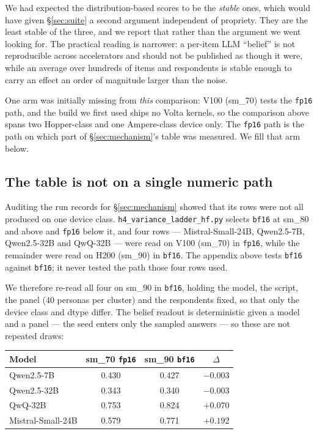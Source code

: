 \documentclass[11pt]{article}
\begin{document}
We had expected the distribution-based scores to be the \emph{stable} ones,
which would have given \S\ref{sec:suite} a second argument independent of
propriety. They are the least stable of the three, and we report that rather
than the argument we went looking for. The practical reading is narrower: a
per-item LLM ``belief'' is not reproducible across accelerators and should not
be published as though it were, while an average over hundreds of items and
respondents is stable enough to carry an effect an order of magnitude larger
than the noise.

One arm was initially missing from \emph{this} comparison: V100 (sm\_70) tests
the \texttt{fp16} path, and the build we first used ships no Volta kernels, so
the comparison above spans two Hopper-class and one Ampere-class device only.
The \texttt{fp16} path is the path on which part of \S\ref{sec:mechanism}'s table
was measured. We fill that arm below.

\subsection{The table is not on a single numeric path}
\label{app:mixedpath}

Auditing the run records for \S\ref{sec:mechanism} showed that its rows were not
all produced on one device class. \texttt{h4\_variance\_ladder\_hf.py} selects
\texttt{bf16} at sm\_80 and above and \texttt{fp16} below it, and four rows ---
Mistral-Small-24B, Qwen2.5-7B, Qwen2.5-32B and QwQ-32B --- were read on V100
(sm\_70) in \texttt{fp16}, while the remainder were read on H200 (sm\_90) in
\texttt{bf16}. The appendix above tests \texttt{bf16} against \texttt{bf16}; it
never tested the path those four rows used.

We therefore re-read all four on sm\_90 in \texttt{bf16}, holding the model, the
script, the panel ($40$ personas per cluster) and the respondents fixed, so that
only the device class and dtype differ. The belief readout is deterministic
given a model and a panel --- the seed enters only the sampled answers --- so
these are not repeated draws:

\begin{center}\scriptsize
\setlength{\tabcolsep}{4pt}
\begin{tabular}{lccc}
\toprule
Model & sm\_70 \texttt{fp16} & sm\_90 \texttt{bf16} & $\Delta$\\
\midrule
Qwen2.5-7B & 0.430 & 0.427 & $-0.003$\\
Qwen2.5-32B & 0.343 & 0.340 & $-0.003$\\
QwQ-32B & 0.753 & 0.824 & $\mathbf{+0.070}$\\
Mistral-Small-24B & 0.579 & 0.771 & $\mathbf{+0.192}$\\
\bottomrule
\end{tabular}
\end{center}
\end{document}
